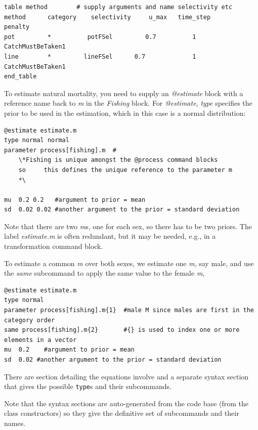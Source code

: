 {\small{\begin{verbatim}
table method        # supply arguments and name selectivity etc
method  	category 	selectivity 	u_max 	time_step 		penalty
pot        	*  	       potFSel		   0.7 			1 	CatchMustBeTaken1
line     	*  	      lineFSel 	    0.7 			1 	CatchMustBeTaken1
end_table
\end{verbatim}}}

To estimate natural mortality, you need to supply an \textit{@estimate} block with a reference name back to \textit{m} in the \textit{Fishing} block. For \textit{@estimate}, \textit{type} specifies the prior to be used in the estimation, which in this case is a normal distribution:

{\small{\begin{verbatim}
@estimate estimate.m
type normal normal
parameter process[fishing].m  #
    \*Fishing is unique amongst the @process command blocks
    so     this defines the unique reference to the parameter m
    *\

mu  0.2 0.2   #argument to prior = mean
sd  0.02 0.02 #another argument to the prior = standard deviation
\end{verbatim}}}

Note that there are two \textit{m}s, one for each sex, so there has to be two priors. The \textit{\@estiamte} label \textit{estimate.m} is often redundant, but it may be needed, e.g., in a transformation command block.

To estimate a common \textit{m} over both sexes, we estimate one \textit{m}, say male, and use the \textit{same} subcommand to apply the same value to the female \textit{m},

{\small{\begin{verbatim}
@estimate estimate.m
type normal 
parameter process[fishing].m{1}  #male M since males are first in the category order
same process[fishing].m{2}       #{} is used to index one or more elements in a vector
mu  0.2    #argument to prior = mean
sd  0.02 #another argument to the prior = standard deviation
\end{verbatim}}}

There are section detailing the equations involve and a separate syntax section that gives the possible \texttt{type}s and their subcommands.

Note that the syntax sections are auto-generated from the code base (from the class constructors) so they give the definitive set of subcommands and their names. 

\subsection{\label{sec:singlestepping}}


